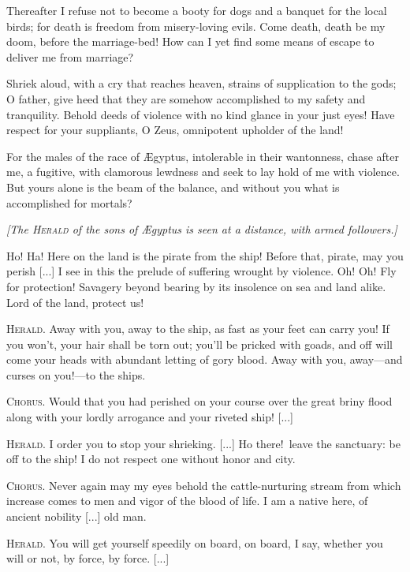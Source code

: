 \documentclass[12pt]{article}
\begin{document}
Thereafter I refuse not to become a booty for dogs and a banquet for the local birds; for death is freedom from misery-loving evils. Come death, death be my doom, before the marriage-bed! How can I yet find some means of escape to deliver me from marriage?

Shriek aloud, with a cry that reaches heaven, strains of supplication to the gods; O father, give heed that they are somehow accomplished to my safety and tranquility. Behold deeds of violence with no kind glance in your just eyes! Have respect for your suppliants, O Zeus, omnipotent upholder of the land!

For the males of the race of {\AE}gyptus, intolerable in their wantonness, chase after me, a fugitive, with clamorous lewdness and seek to lay hold of me with violence. But yours alone is the beam of the balance, and without you what is accomplished for mortals?

\begin{center}
\textit{[The \textsc{Herald} of the sons of {\AE}gyptus is seen at a distance, with armed followers.]}
\end{center}

Ho! Ha! Here on the land is the pirate from the ship! Before that, pirate, may you perish [...] I see in this the prelude of suffering wrought by violence. Oh! Oh! Fly for protection! Savagery beyond bearing by its insolence on sea and land alike. Lord of the land, protect us!

\textsc{Herald.} Away with you, away to the ship, as fast as your feet can carry you! If you won't, your hair shall be torn out; you'll be pricked with goads, and off will come your heads with abundant letting of gory blood. Away with you, away---and curses on you!---to the ships.

\textsc{Chorus.} Would that you had perished on your course over the great briny flood along with your lordly arrogance and your riveted ship! [...]

\textsc{Herald.} I order you to stop your shrieking. [...] Ho there!~leave the sanctuary: be off to the ship! I do not respect one without honor and city.

\textsc{Chorus.} Never again may my eyes behold the cattle-nurturing stream from which increase comes to men and vigor of the blood of life. I am a native here, of ancient nobility [...] old man.

\textsc{Herald.} You will get yourself speedily on board, on board, I say, whether you will or not, by force, by force. [...]
\end{document}
